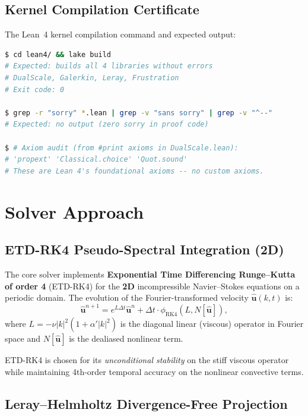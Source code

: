 \documentclass[11pt,a4paper,twoside]{article}
\newcommand{\alphap}{\alpha'}
\begin{document}
\subsection{Kernel Compilation Certificate}

The Lean~4 kernel compilation command and expected output:

\begin{lstlisting}[language=bash,caption={Lean~4 kernel build command}]
$ cd lean4/ && lake build
# Expected: builds all 4 libraries without errors
# DualScale, Galerkin, Leray, Frustration
# Exit code: 0

$ grep -r "sorry" *.lean | grep -v "sans sorry" | grep -v "^--"
# Expected: no output (zero sorry in proof code)

$ # Axiom audit (from #print axioms in DualScale.lean):
# 'propext' 'Classical.choice' 'Quot.sound'
# These are Lean 4's foundational axioms -- no custom axioms.
\end{lstlisting}

\section{Solver Approach}
\label{sec:approach}

\subsection{ETD-RK4 Pseudo-Spectral Integration (2D)}

The core solver implements \textbf{Exponential Time Differencing Runge--Kutta of order 4} (ETD-RK4) \cite{cox2002exponential} for the \textbf{2D} incompressible Navier--Stokes equations on a periodic domain.
The evolution of the Fourier-transformed velocity $\hat{\mathbf{u}}(k,t)$ is:
\begin{equation}
\hat{\mathbf{u}}^{n+1} = e^{L\Delta t}\hat{\mathbf{u}}^n + \Delta t \cdot \phi_{\text{RK4}}(L, N[\hat{\mathbf{u}}]),
\label{eq:etdrk4}
\end{equation}
where $L = -\nu |k|^2(1 + \alphap |k|^2)$ is the diagonal linear (viscous) operator in Fourier space and $N[\hat{\mathbf{u}}]$ is the dealiased nonlinear term.

ETD-RK4 is chosen for its \emph{unconditional stability} on the stiff viscous operator while maintaining 4th-order temporal accuracy on the nonlinear convective terms.

\subsection{Leray--Helmholtz Divergence-Free Projection}
\end{document}
